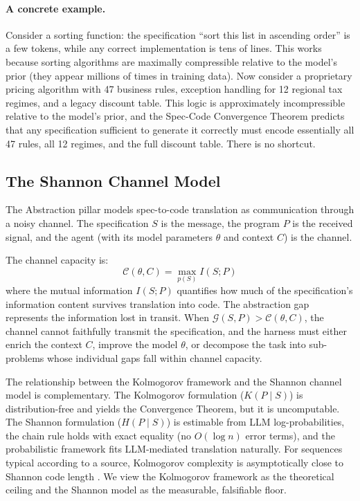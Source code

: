\documentclass[11pt, a4paper, logo, copyright]{googledeepmind}
\begin{document}
\paragraph{A concrete example.} Consider a sorting function: the specification ``sort this list in ascending order'' is a few tokens, while any correct implementation is tens of lines. This works because sorting algorithms are maximally compressible relative to the model's prior (they appear millions of times in training data). Now consider a proprietary pricing algorithm with 47 business rules, exception handling for 12 regional tax regimes, and a legacy discount table. This logic is approximately incompressible relative to the model's prior, and the Spec-Code Convergence Theorem predicts that any specification sufficient to generate it correctly must encode essentially all 47 rules, all 12 regimes, and the full discount table. There is no shortcut.

\subsection{The Shannon Channel Model}

The Abstraction pillar models spec-to-code translation as communication through a noisy channel. The specification $S$ is the message, the program $P$ is the received signal, and the agent (with its model parameters $\theta$ and context $C$) is the channel.

The channel capacity is:
\begin{equation}
    \mathcal{C}(\theta, C) = \max_{p(S)} I(S; P)
\end{equation}
where the mutual information $I(S; P)$ quantifies how much of the specification's information content survives translation into code. The abstraction gap represents the information lost in transit. When $\mathcal{G}(S, P) > \mathcal{C}(\theta, C)$, the channel cannot faithfully transmit the specification, and the harness must either enrich the context $C$, improve the model $\theta$, or decompose the task into sub-problems whose individual gaps fall within channel capacity.

The relationship between the Kolmogorov framework and the Shannon channel model is complementary. The Kolmogorov formulation ($K(P \mid S)$) is distribution-free and yields the Convergence Theorem, but it is uncomputable. The Shannon formulation ($H(P \mid S)$) is estimable from LLM log-probabilities, the chain rule holds with exact equality (no $O(\log n)$ error terms), and the probabilistic framework fits LLM-mediated translation naturally. For sequences typical according to a source, Kolmogorov complexity is asymptotically close to Shannon code length \citep{vitanyi2004shannon}. We view the Kolmogorov framework as the theoretical ceiling and the Shannon model as the measurable, falsifiable floor.
\end{document}
